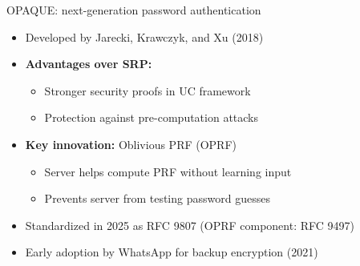 \ifdefined\PRESENTATION\else\PassOptionsToClass{handout}{beamer}\fi\documentclass[aspectratio=169, lualatex]{beamer}
\begin{document}
\begin{frame}{OPAQUE: next-generation password authentication}
	\begin{itemize}
		\item Developed by Jarecki, Krawczyk, and Xu (2018)
		\item \textbf{Advantages over SRP:}
		      \begin{itemize}
			      \item Stronger security proofs in UC framework
			      \item Protection against pre-computation attacks
		      \end{itemize}
		\item \textbf{Key innovation:} Oblivious PRF (OPRF)
		      \begin{itemize}
			      \item Server helps compute PRF without learning input
			      \item Prevents server from testing password guesses
		      \end{itemize}
		\item Standardized in 2025 as RFC 9807 (OPRF component: RFC 9497)
		\item Early adoption by WhatsApp for backup encryption (2021)
	\end{itemize}
\end{frame}
\end{document}
